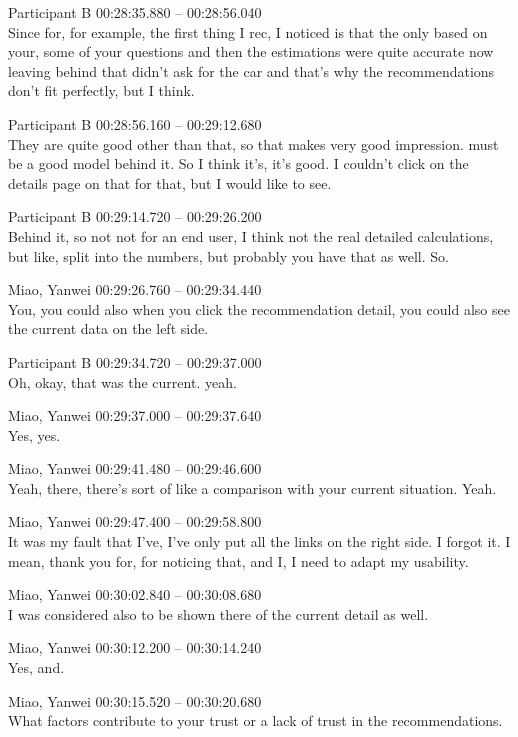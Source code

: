 {Participant B 00:28:35.880 -- 00:28:56.040 \\
Since for, for example, the first thing I rec, I noticed is that the only based on your, some of your questions and then the estimations were quite accurate now leaving behind that didn't ask for the car and that's why the recommendations don't fit perfectly, but I think.

Participant B 00:28:56.160 -- 00:29:12.680 \\
They are quite good other than that, so that makes very good impression. must be a good model behind it. So I think it's, it's good. I couldn't click on the details page on that for that, but I would like to see.

Participant B 00:29:14.720 -- 00:29:26.200 \\
Behind it, so not not for an end user, I think not the real detailed calculations, but like, split into the numbers, but probably you have that as well. So.

Miao, Yanwei 00:29:26.760 -- 00:29:34.440 \\
You, you could also when you click the recommendation detail, you could also see the current data on the left side.

Participant B 00:29:34.720 -- 00:29:37.000 \\
Oh, okay, that was the current. yeah.

Miao, Yanwei 00:29:37.000 -- 00:29:37.640 \\
Yes, yes.

Miao, Yanwei 00:29:41.480 -- 00:29:46.600 \\
Yeah, there, there's sort of like a comparison with your current situation. Yeah.

Miao, Yanwei 00:29:47.400 -- 00:29:58.800 \\
It was my fault that I've, I've only put all the links on the right side. I forgot it. I mean, thank you for, for noticing that, and I, I need to adapt my usability.

Miao, Yanwei 00:30:02.840 -- 00:30:08.680 \\
I was considered also to be shown there of the current detail as well.

Miao, Yanwei 00:30:12.200 -- 00:30:14.240 \\
Yes, and.

Miao, Yanwei 00:30:15.520 -- 00:30:20.680 \\
What factors contribute to your trust or a lack of trust in the recommendations.

}
